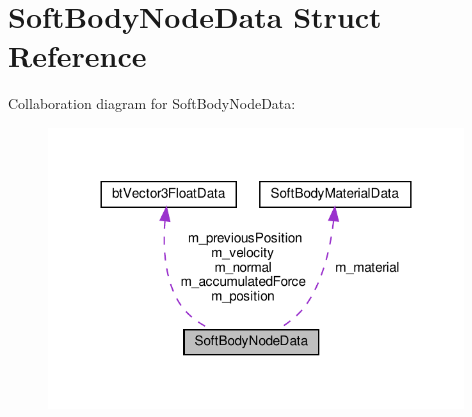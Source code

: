 \hypertarget{structSoftBodyNodeData}{}\section{Soft\+Body\+Node\+Data Struct Reference}
\label{structSoftBodyNodeData}


Collaboration diagram for Soft\+Body\+Node\+Data\+:
\nopagebreak
\begin{figure}[H]
\begin{center}
\leavevmode
\includegraphics[width=312pt]{structSoftBodyNodeData__coll__graph}
\end{center}
\end{figure}
